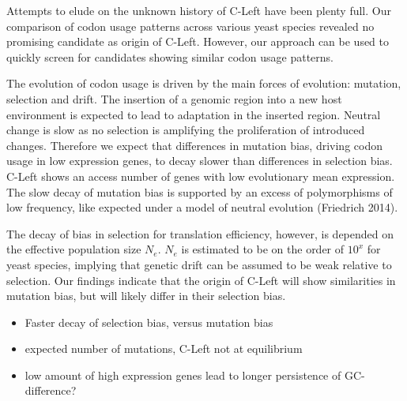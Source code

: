 \documentclass[12pt,draft]{article}
\begin{document}
Attempts to elude on the unknown history of C-Left have been plenty full. 
Our comparison of codon usage patterns across various yeast species revealed no promising candidate as origin of C-Left.
However, our approach can be used to quickly screen for candidates showing similar codon usage patterns.

The evolution of codon usage is driven by the main forces of evolution: mutation, selection and drift.
The insertion of a genomic region into a new host environment is expected to lead to adaptation in the inserted region.
Neutral change is slow as no selection is amplifying the proliferation of introduced changes.
Therefore we expect that differences in mutation bias, driving codon usage in low expression genes, to decay slower than differences in selection bias.
C-Left shows an access number of genes with low evolutionary mean expression.
The slow decay of mutation bias is supported by an excess of polymorphisms of low frequency, like expected under a model of neutral evolution (Friedrich 2014).

The decay of bias in selection for translation efficiency, however, is depended on the effective population size $N_e$.  
$N_e$ is estimated to be on the order of $10^x$ for yeast species, implying that genetic drift can be assumed to be weak relative to selection.
Our findings indicate that the origin of C-Left will show similarities in mutation bias, but will likely differ in their selection bias.


\begin{itemize}
	\item Faster decay of selection bias, versus mutation bias
	\item expected number of mutations, C-Left not at equilibrium
	\item low amount of high expression genes lead to longer persistence of GC-difference?
\end{itemize}
\end{document}
